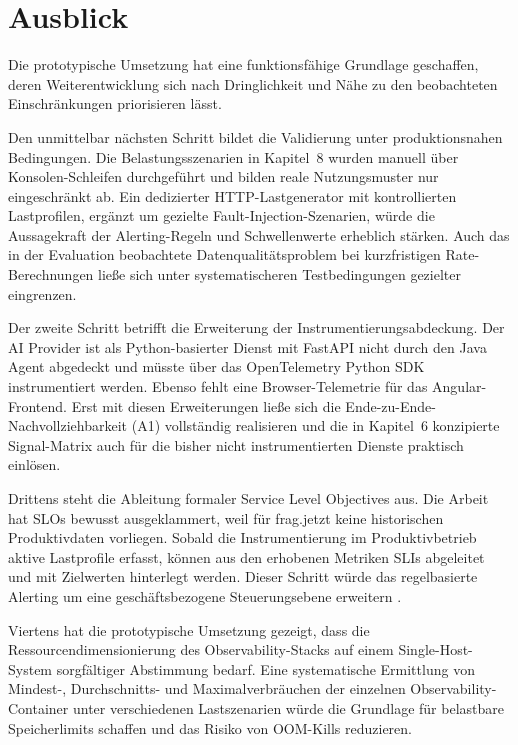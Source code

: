  
\section{Ausblick}
 
Die prototypische Umsetzung hat eine funktionsfähige Grundlage geschaffen, deren Weiterentwicklung sich nach Dringlichkeit und Nähe zu den beobachteten Einschränkungen priorisieren lässt.
 
Den unmittelbar nächsten Schritt bildet die Validierung unter produktionsnahen Bedingungen. Die Belastungsszenarien in Kapitel~8 wurden manuell über Konsolen-Schleifen durchgeführt und bilden reale Nutzungsmuster nur eingeschränkt ab. Ein dedizierter HTTP-Lastgenerator mit kontrollierten Lastprofilen, ergänzt um gezielte Fault-Injection-Szenarien, würde die Aussagekraft der Alerting-Regeln und Schwellenwerte erheblich stärken. Auch das in der Evaluation beobachtete Datenqualitätsproblem bei kurzfristigen Rate-Berechnungen ließe sich unter systematischeren Testbedingungen gezielter eingrenzen.
 
Der zweite Schritt betrifft die Erweiterung der Instrumentierungsabdeckung. Der AI Provider ist als Python-basierter Dienst mit FastAPI nicht durch den Java Agent abgedeckt und müsste über das OpenTelemetry Python SDK instrumentiert werden. Ebenso fehlt eine Browser-Telemetrie für das Angular-Frontend. Erst mit diesen Erweiterungen ließe sich die Ende-zu-Ende-Nachvollziehbarkeit (A1) vollständig realisieren und die in Kapitel~6 konzipierte Signal-Matrix auch für die bisher nicht instrumentierten Dienste praktisch einlösen.
 
Drittens steht die Ableitung formaler Service Level Objectives aus. Die Arbeit hat SLOs bewusst ausgeklammert, weil für frag.jetzt keine historischen Produktivdaten vorliegen. Sobald die Instrumentierung im Produktivbetrieb aktive Lastprofile erfasst, können aus den erhobenen Metriken SLIs abgeleitet und mit Zielwerten hinterlegt werden. Dieser Schritt würde das regelbasierte Alerting um eine geschäftsbezogene Steuerungsebene erweitern \parencite[S.~11--12]{Niedermaier2019onObservability}.
 
Viertens hat die prototypische Umsetzung gezeigt, dass die Ressourcendimensionierung des Observability-Stacks auf einem Single-Host-System sorgfältiger Abstimmung bedarf. Eine systematische Ermittlung von Mindest-, Durchschnitts- und Maximalverbräuchen der einzelnen Observability-Container unter verschiedenen Lastszenarien würde die Grundlage für belastbare Speicherlimits schaffen und das Risiko von OOM-Kills reduzieren.
 
